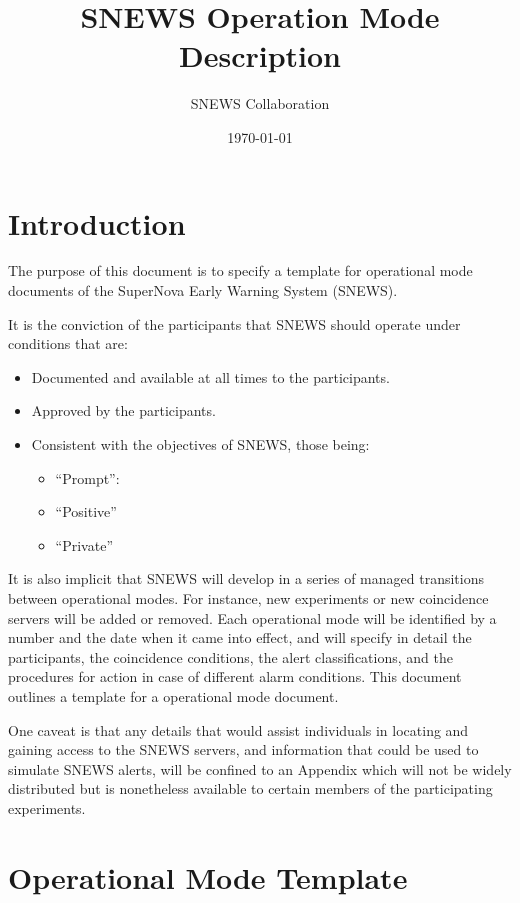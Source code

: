 \documentclass{article}
\begin{document}
\title{SNEWS Operation Mode Description}         
\author{SNEWS Collaboration}
\date{\today}
\maketitle

\section{Introduction}      
The purpose of this document is to specify a template for operational
mode documents of the SuperNova Early Warning System (SNEWS).

It is the conviction of the participants that SNEWS should operate
under conditions that are:

\begin{itemize}
\item Documented and available at all times to the participants.
\item Approved by the participants.
\item Consistent with the objectives of SNEWS, those being:
\begin{itemize}
\item ``Prompt'':
\item ``Positive''
\item ``Private''
\end{itemize}
\end{itemize}

It is also implicit that SNEWS will develop in a series of managed
transitions between operational modes. For instance, new experiments
or new coincidence servers will be added or removed.  Each operational
mode will be identified by a number and the date when it came into
effect, and will specify in detail the participants, the coincidence
conditions, the alert classifications, and the procedures for action
in case of different alarm conditions.  This document outlines a
template for a operational mode document.

One caveat is that any details that would assist individuals in locating
and gaining access to the SNEWS servers, and information that could be
used to simulate SNEWS alerts, will be confined to an Appendix which
will not be widely distributed but is nonetheless available to certain
members of the participating experiments.


\section{Operational Mode Template}
\end{document}
